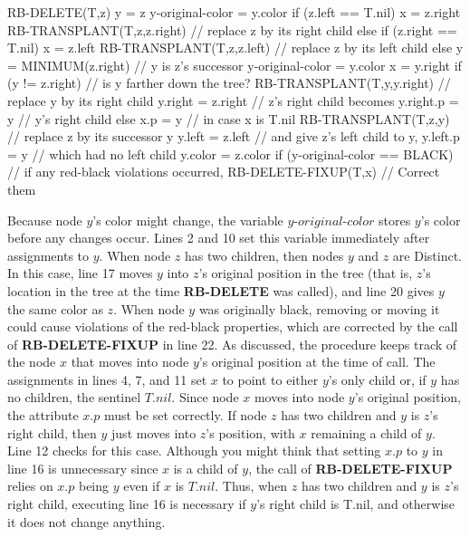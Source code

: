 \documentclass{report}
\begin{document}
\pagebreak 
\bigbreak \noindent 
\begin{cppcode}
    RB-DELETE(T,z) {
        y = z 
        y-original-color = y.color
        if (z.left == T.nil)
            x = z.right
            RB-TRANSPLANT(T,z,z.right) // replace z by its right child
        else if (z.right == T.nil)
            x = z.left
            RB-TRANSPLANT(T,z,z.left) // replace z by its left child 
        else 
            y = MINIMUM(z.right) // y is z's successor
            y-original-color = y.color
            x = y.right
            if (y != z.right) // is y farther down the tree?
                RB-TRANSPLANT(T,y,y.right)  // replace y by its right child 
                y.right = z.right // z's right child becomes
                y.right.p = y // y’s right child
            else x.p = y // in case x is T.nil
            RB-TRANSPLANT(T,z,y) // replace z by its successor y
            y.left = z.left // and give z's left child to y, 
            y.left.p = y // which had no left child
            y.color = z.color
        if (y-original-color == BLACK) // if any red-black violations occurred,
            RB-DELETE-FIXUP(T,x) // Correct them
    }
\end{cppcode}
\bigbreak \noindent 
Because node \(y\)'s color might change, the variable \(y\text{-}original\text{-}color\) stores \(y\)'s color before any changes occur. Lines 2 and 10 set this variable immediately after assignments to \(y\). When node \(z\) has two children, then nodes \(y\) and \(z\) are
Distinct. In this case, line 17 moves \(y\) into \(z\)'s original position in the tree (that is, \(z\)'s location in the tree at the time \textbf{RB-DELETE} was called), and line 20 gives \(y\) the same color as \(z\). When node \(y\) was originally black, removing or moving it could cause violations of the red-black properties, which are corrected by the call of \textbf{RB-DELETE-FIXUP} in line 22.
\bigbreak \noindent 
As discussed, the procedure keeps track of the node \(x\) that moves into node \(y\)'s original position at the time of call. The assignments in lines 4, 7, and 11 set \(x\) to point to either \(y\)'s only child or, if \(y\) has no children, the sentinel \(T.nil\).
\bigbreak \noindent 
Since node \(x\) moves into node \(y\)'s original position, the attribute \(x.p\) must be set correctly. If node \(z\) has two children and \(y\) is \(z\)'s right child, then \(y\) just moves into \(z\)'s position, with \(x\) remaining a child of \(y\). Line 12 checks for this case. Although you might think that setting \(x.p\) to \(y\) in line 16 is unnecessary since \(x\) is a child of \(y\), the call of \textbf{RB-DELETE-FIXUP} relies on \(x.p\) being \(y\) even if \(x\) is \(T.nil\). Thus, when \(z\) has two children and \(y\) is \(z\)'s right child, executing line 16 is necessary if $y$’s right child is T.nil, and otherwise it does not change anything.
\end{document}
